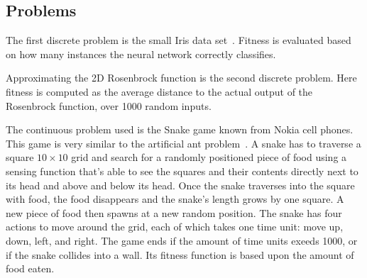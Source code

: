 \subsection{Problems}
The first discrete problem is the small Iris data set~\cite{Bache+Lichman:2013}. Fitness is evaluated based on how many instances the neural network correctly classifies.

Approximating the 2D Rosenbrock function is the second discrete problem. Here fitness is computed as the average distance to the actual output of the Rosenbrock function, over \num{1000} random inputs.

The continuous problem used is the Snake game known from Nokia cell phones. This game is very similar to the artificial ant problem~\cite[p. 147--155]{koza1992genetic}. A snake has to traverse a square $10\times 10$ grid and search for a randomly positioned piece of food using a sensing function that's able to see the squares and their contents directly next to its head and above and below its head. Once the snake traverses into the square with food, the food disappears and the snake's length grows by one square. A new piece of food then spawns at a new random position. The snake has four actions to move around the grid, each of which takes one time unit: move up, down, left, and right. The game ends if the amount of time units exeeds \num{1000}, or if the snake collides into a wall.  Its fitness function is based upon the amount of food eaten.
